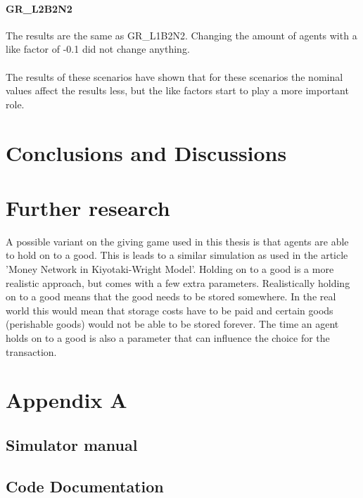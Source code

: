 \documentclass[twoside,openright]{uva-bachelor-thesis}
\begin{document}
\subsubsection{GR\_L2B2N2}
The results are the same as GR\_L1B2N2. Changing the amount of agents with a like factor of -0.1 did not change anything.
\\
\\
The results of these scenarios have shown that for these scenarios the nominal values affect the results less, but the like factors start to play a more important role.

\chapter{Conclusions and Discussions}

\chapter{Further research}
A possible variant on the giving game used in this thesis is that agents are able to hold on to a good. This is leads to a similar simulation as used in the article 'Money Network in Kiyotaki-Wright Model'. Holding on to a good is a more realistic approach, but comes with a few extra parameters. Realistically holding on to a good means that the good needs to be stored somewhere. In the real world this would mean that storage costs have to be paid and certain goods (perishable goods) would not be able to be stored forever. The time an agent holds on to a good is also a parameter that can influence the choice for the transaction.

\chapter{Appendix A}

\section{Simulator manual}

\section{Code Documentation}
\end{document}
